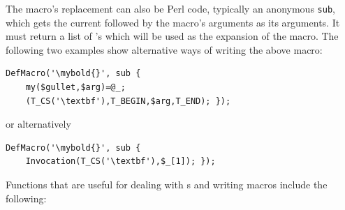 \documentclass{book}
\begin{document}
The macro's replacement can also be Perl code, typically an
anonymous \texttt{sub}, which gets the current 
followed by the macro's arguments as its arguments.  It must
return a list of 's which will be used as the
expansion of the macro.  The following two examples show
alternative ways of writing the above macro:
\begin{lstlisting}[style=latexml]
  DefMacro('\mybold{}', sub {
    my($gullet,$arg)=@_;
    (T_CS('\textbf'),T_BEGIN,$arg,T_END); });
\end{lstlisting}
or alternatively
\begin{lstlisting}[style=latexml]
  DefMacro('\mybold{}', sub {
    Invocation(T_CS('\textbf'),$_[1]); });
\end{lstlisting}

Functions that are useful for dealing with s and writing macros
include the following:
\end{document}
